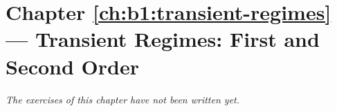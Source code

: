 \section*{Chapter \ref{ch:b1:transient-regimes} --- Transient Regimes: First and Second Order}


\emph{The exercises of this chapter have not been written yet.}
